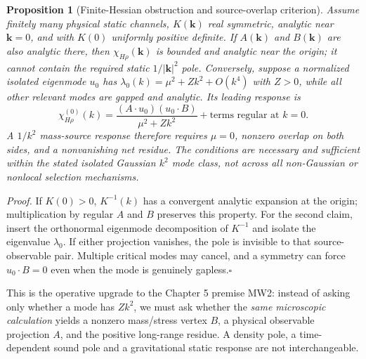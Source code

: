 \documentclass[11pt,a4paper]{article}
\newtheorem{proposition}{Proposition}[section]\newtheorem{lemma}[proposition]{Lemma}\newtheorem{definition}[proposition]{Definition}\newtheorem{remark}[proposition]{Remark}
\begin{document}
\begin{proposition}[Finite-Hessian obstruction and source-overlap criterion]\label{prop:v09-overlap}
Assume finitely many physical static channels, $K(\bm k)$ real symmetric, analytic near $\bm k=0$, and with $K(0)$ uniformly positive definite. If $A(\bm k)$ and $B(\bm k)$ are also analytic there, then $\chi_{H\rho}(\bm k)$ is bounded and analytic near the origin; it cannot contain the required static $1/|\bm k|^2$ pole. Conversely, suppose a normalized isolated eigenmode $u_0$ has $\lambda_0(k)=\mu^2+Zk^2+O(k^4)$ with $Z>0$, while all other relevant modes are gapped and analytic. Its leading response is
\begin{equation}\label{eq:v09-residue}
\chi_{H\rho}^{(0)}(k)=\frac{(A\cdot u_0)(u_0\cdot B)}{\mu^2+Zk^2}+\text{terms regular at }k=0.
\end{equation}
A $1/k^2$ mass-source response therefore requires $\mu=0$, \emph{nonzero overlap on both sides}, and a nonvanishing net residue. The conditions are necessary and sufficient within the stated isolated Gaussian $k^2$ mode class, not across all non-Gaussian or nonlocal selection mechanisms.
\end{proposition}
\textit{Proof.} If $K(0)>0$, $K^{-1}(k)$ has a convergent analytic expansion at the origin; multiplication by regular $A$ and $B$ preserves this property. For the second claim, insert the orthonormal eigenmode decomposition of $K^{-1}$ and isolate the eigenvalue $\lambda_0$. If either projection vanishes, the pole is invisible to that source-observable pair. Multiple critical modes may cancel, and a symmetry can force $u_0\cdot B=0$ even when the mode is genuinely gapless.\hfill$\square$

This is the operative upgrade to the Chapter 5 premise MW2: instead of asking only whether a mode has $Zk^2$, we must ask whether the \emph{same microscopic calculation} yields a nonzero mass/stress vertex $B$, a physical observable projection $A$, and the positive long-range residue. A density pole, a time-dependent sound pole and a gravitational static response are not interchangeable.
\end{document}
